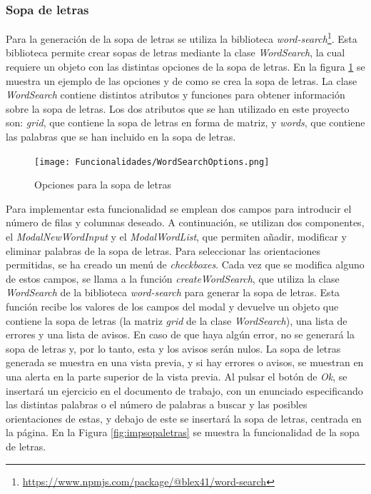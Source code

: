 \subsubsection{Sopa de letras}
\label{sec:impsopaletras}
Para la generación de la sopa de letras se utiliza la biblioteca \textit{word-search}\footnote{\url{https://www.npmjs.com/package/@blex41/word-search}}. Esta biblioteca permite crear sopas de letras mediante la clase \textit{WordSearch}, la cual requiere un objeto con las distintas opciones de la sopa de letras. En la figura \ref{fig:impsopaletrasopciones} se muestra un ejemplo de las opciones y de como se crea la sopa de letras. La clase \textit{WordSearch} contiene distintos atributos y funciones para obtener información sobre la sopa de letras. Los dos atributos que se han utilizado en este proyecto son: \textit{grid}, que contiene la sopa de letras en forma de matriz, y \textit{words}, que contiene las palabras que se han incluido en la sopa de letras.

\begin{figure}[ht!]
  \centering
  \texttt{[image: Funcionalidades/WordSearchOptions.png]}
  \caption{Opciones para la sopa de letras}
  \label{fig:impsopaletrasopciones}
\end{figure}

Para implementar esta funcionalidad se emplean dos campos para introducir el número de filas y columnas deseado. A continuación, se utilizan dos componentes, el \textit{ModalNewWordInput} y el \textit{ModalWordList}, que permiten añadir, modificar y eliminar palabras de la sopa de letras. Para seleccionar las orientaciones permitidas, se ha creado un menú de \textit{checkboxes}. Cada vez que se modifica alguno de estos campos, se llama a la función \textit{createWordSearch}, que utiliza la clase \textit{WordSearch} de la biblioteca \textit{word-search} para generar la sopa de letras. Esta función recibe los valores de los campos del modal y devuelve un objeto que contiene la sopa de letras (la matriz \textit{grid} de la clase \textit{WordSearch}), una lista de errores y una lista de avisos. En caso de que haya algún error, no se generará la sopa de letras y, por lo tanto, esta y los avisos serán nulos. La sopa de letras generada se muestra en una vista previa, y si hay errores o avisos, se muestran en una alerta en la parte superior de la vista previa. Al pulsar el botón de \textit{Ok}, se insertará un ejercicio en el documento de trabajo, con un enunciado especificando las distintas palabras o el número de palabras a buscar y las posibles orientaciones de estas, y debajo de este se insertará la sopa de letras, centrada en la página. En la Figura \ref{fig:impsopaletras} se muestra la funcionalidad de la sopa de letras.

